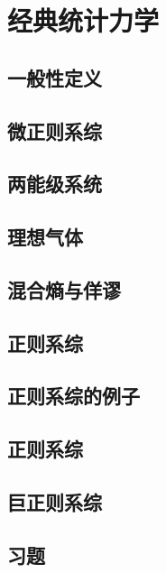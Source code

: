 \chapter{经典统计力学}

\section{一般性定义}
\section{微正则系综}
\section{两能级系统}
\section{理想气体}
\section{混合熵与佯谬}
\section{正则系综}
\section{正则系综的例子}
\section{正则系综}
\section{巨正则系综}
\section*{习题}